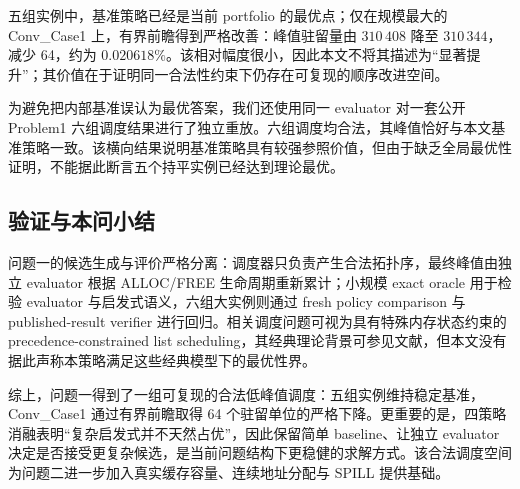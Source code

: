 五组实例中，基准策略已经是当前 portfolio 的最优点；仅在规模最大的 Conv\_Case1 上，有界前瞻得到严格改善：峰值驻留量由 $310\,408$ 降至 $310\,344$，减少 64，约为 $0.020618\%$。该相对幅度很小，因此本文不将其描述为“显著提升”；其价值在于证明同一合法性约束下仍存在可复现的顺序改进空间。

为避免把内部基准误认为最优答案，我们还使用同一 evaluator 对一套公开 Problem1 六组调度结果进行了独立重放。六组调度均合法，其峰值恰好与本文基准策略一致。该横向结果说明基准策略具有较强参照价值，但由于缺乏全局最优性证明，不能据此断言五个持平实例已经达到理论最优。

\subsection{验证与本问小结}

问题一的候选生成与评价严格分离：调度器只负责产生合法拓扑序，最终峰值由独立 evaluator 根据 ALLOC/FREE 生命周期重新累计；小规模 exact oracle 用于检验 evaluator 与启发式语义，六组大实例则通过 fresh policy comparison 与 published-result verifier 进行回归。相关调度问题可视为具有特殊内存状态约束的 precedence-constrained list scheduling，其经典理论背景可参见文献\cite{graham1969multiprocessing,hu1961parallel}，但本文没有据此声称本策略满足这些经典模型下的最优性界。

综上，问题一得到了一组可复现的合法低峰值调度：五组实例维持稳定基准，Conv\_Case1 通过有界前瞻取得 64 个驻留单位的严格下降。更重要的是，四策略消融表明“复杂启发式并不天然占优”，因此保留简单 baseline、让独立 evaluator 决定是否接受更复杂候选，是当前问题结构下更稳健的求解方式。该合法调度空间为问题二进一步加入真实缓存容量、连续地址分配与 SPILL 提供基础。
